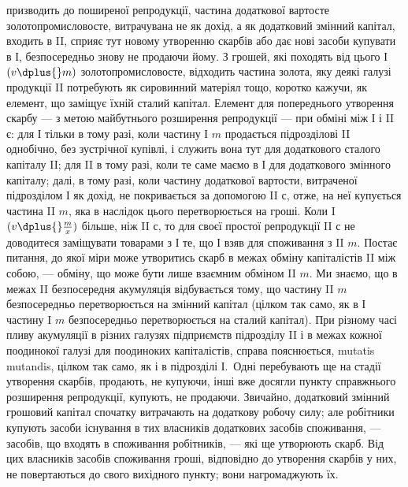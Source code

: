 \parcont{}  %
призводить до поширеної репродукції, частина додаткової вартосте золотопромисловосте,
витрачувана не як дохід, а як додатковий змінний
капітал, входить в II, сприяє тут новому утворенню скарбів або дає нові
засоби купувати в І, безпосередньо знову не продаючи йому. З грошей,
які походять від цього І $(v \dplus{} m)$ золотопромисловосте, відходить частина
золота, яку деякі галузі продукції II потребують як сировинний матеріял
тощо, коротко кажучи, як елемент, що заміщує їхній сталий капітал.
Елемент для попереднього утворення скарбу — з метою майбутнього розширення
репродукції — при обміні між І і II є: для І тільки в тому разі,
коли частину І $m$ продається підрозділові II однобічно, без зустрічної
купівлі, і служить вона тут для додаткового сталого капіталу II; для II
в тому разі, коли те саме маємо в І для додаткового змінного капіталу;
далі, в тому разі, коли частину додаткової вартости, витраченої підрозділом
І як дохід, не покривається за допомогою II $с$, отже, на неї купується
частина II $m$, яка в наслідок цього перетворюється на гроші. Коли
I $(v \dplus{} \frac{m}{x})$ більше, ніж II $с$, то для своєї простої репродукції II $с$ не
доводитеся заміщувати товарами з І те, що І взяв для споживання з II $m$.
Постає питання, до якої міри може утворитись скарб в межах обміну
капіталістів II між собою, — обміну, що може бути лише взаємним
обміном II $m$. Ми знаємо, що в межах II безпосередня акумуляція відбувається
тому, що частину II $m$ безпосередньо перетворюється на змінний
капітал (цілком так само, як в І частину I $m$ безпосередньо перетворюється
на сталий капітал). При різному часі пливу акумуляції в різних галузях
підприємств підрозділу II і в межах кожної поодинокої галузі для поодиноких
капіталістів, справа пояснюється, mutatis mutandis, цілком так само,
як і в підрозділі І.~Одні перебувають ще на стадії утворення скарбів,
продають, не купуючи, інші вже досягли пункту справжнього розширення
репродукції, купують, не продаючи. Звичайно, додатковий змінний грошовий
капітал спочатку витрачають на додаткову робочу силу; але робітники
купують засоби існування в тих власників додаткових засобів
споживання, — засобів, що входять в споживання робітників, — які ще
утворюють скарб. Від цих власників засобів споживання гроші, відповідно
до утворення скарбів у них, не повертаються до свого вихідного
пункту; вони нагромаджують їх.
\label{original-409}